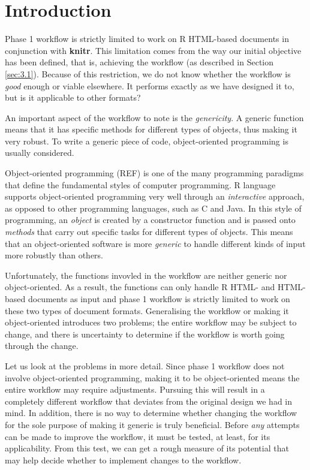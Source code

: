\documentclass[a4paper, 12pt]{report}
\begin{document}
\section{Introduction}
Phase 1 workflow is strictly limited to work on R HTML-based documents in conjunction with \textbf{knitr}. This limitation comes from the way our initial objective has been defined, that is, achieving the workflow (as described in Section \ref{sec:3.1}). Because of this restriction, we do not know whether the workflow is \emph{good} enough or viable elsewhere. It performs exactly as we have designed it to, but is it applicable to other formats?

An important aspect of the workflow to note is the \emph{genericity}. A generic function means that it has specific methods for different types of objects, thus making it very robust. To write a generic piece of code, object-oriented programming is usually considered.

Object-oriented programming (REF) is one of the many programming paradigms that define the fundamental styles of computer programming. R language supports object-oriented programming very well through an \emph{interactive} approach, as opposed to other programming languages, such as C and Java. In this style of programming, an \emph{object} is created by a constructor function and is passed onto \emph{methods} that carry out specific tasks for different types of objects. This means that an object-oriented software is more \emph{generic} to handle different kinds of input more robustly than others.

Unfortunately, the functions invovled in the workflow are neither generic nor object-oriented. As a result, the functions can only handle R HTML- and HTML-based documents as input and phase 1 workflow is strictly limited to work on these two types of document formats. Generalising the workflow or making it object-oriented introduces two problems; the entire workflow may be subject to change, and there is uncertainty to determine if the workflow is worth going through the change.

Let us look at the problems in more detail. Since phase 1 workflow does not involve object-oriented programming, making it to be object-oriented means the entire workflow may require adjustments. Pursuing this will result in a completely different workflow that deviates from the original design we had in mind. In addition, there is no way to determine whether changing the workflow for the sole purpose of making it generic is truly beneficial. Before \emph{any} attempts can be made to improve the workflow, it must be tested, at least, for its applicability. From this test, we can get a rough measure of its potential that may help decide whether to implement changes to the workflow.
\end{document}
